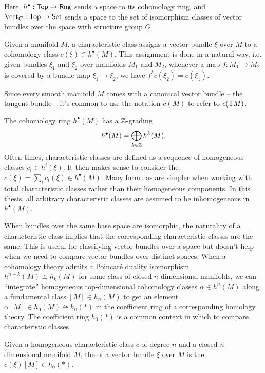 Here, $h^\bullet : \mathsf{Top} \to \mathsf{Rng}$ sends a space to its  cohomology ring, and $\operatorname{Vect}_G : \mathsf{Top} \to \mathsf{Set}$ sends a space to the set of isomorphism classes of vector bundles over the space with structure group $G$.

Given a manifold $M$, a characteristic class assigns a vector bundle $\xi$ over $M$ to a cohomology class $c(\xi)\in h^\bullet(M)$.
This assignment is done in a natural way, i.e. given bundles $\xi_1$ and $\xi_2$ over manifolds $M_1$ and $M_2$, whenever a map $f : M_1 \to M_2$ is covered by a bundle map $\xi_1 \to \xi_2$, we have $f^* c(\xi_2) = c(\xi_1)$. 

\begin{convention*}
	Since every smooth manifold $M$ comes with a canonical vector bundle -- the tangent bundle -- it's common to use the notation $c(M)$ to refer to $c(\mathrm{T} M)$.
\end{convention*}

\begin{remark} 
	The cohomology ring $h^\bullet(M)$ has a $\mathbb{Z}$-grading
\[
		h^\bullet(M) = \bigoplus_{k\in \mathbb{Z}} h^k(M).
\]
Often times, characteristic classes are defined as a sequence of homogeneous classes $c_i\in h^{i}(\xi)$. It then makes sense to consider the  $c(\xi)=\sum_i c_i(\xi)\in h^\bullet(M)$. Many formulas are simpler when working with total characteristic classes rather than their homogeneous components. In this thesis, all arbitrary characteristic classes are assumed to be inhomogeneous in $h^\bullet(M)$.
\end{remark}

When bundles over the same base space are isomorphic, the naturality of a characteristic class implies that the corresponding characteristic classes are the same. This is useful for classifying vector bundles over a space but doesn't help when we need to compare vector bundles over distinct spaces.
When a cohomology theory admits a Poincar\'e duality isomorphism $h^{n-k}(M) \cong h_k(M)$ for some class of closed $n$-dimensional manifolds, we can ``integrate'' homogeneous top-dimensional cohomology classes $\alpha\in h^{n}(M)$ along a fundamental class $[M]\in h_n(M)$ to get an element $\alpha[M]\in h_0(M)\cong h_0(*)$ in the coefficient ring of a corresponding homology theory. The coefficient ring $h_0(*)$ is a common context in which to compare characteristic classes.

\begin{definition}\label{defn:characteristic-numbers}
	Given a homogeneous characteristic class $c$ of degree $n$ and a closed $n$-dimensional manifold $M$, the  of a vector bundle $\xi$ over $M$ is the $c(\xi)[M] \in h_0(*)$.
\end{definition}

